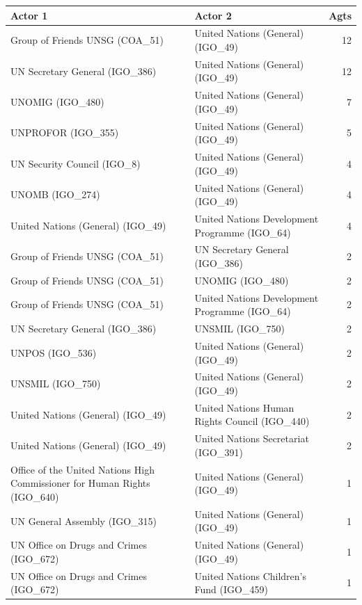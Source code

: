 \documentclass{article}
\begin{document}
\begin{table}[H]
\begin{center}
\small
\begin{tabularx}{\textwidth}{|X|X|r|}
    \hline
    \textbf{Actor 1} & \textbf{Actor 2} & \textbf{Agts} \\
    \hline
    \hline
Group of Friends UNSG (COA\_51) & United Nations (General) (IGO\_49) & 12 \\
\hline
UN Secretary General (IGO\_386) & United Nations (General) (IGO\_49) & 12 \\
\hline
UNOMIG (IGO\_480) & United Nations (General) (IGO\_49) & 7 \\
\hline
UNPROFOR (IGO\_355) & United Nations (General) (IGO\_49) & 5 \\
\hline
UN Security Council (IGO\_8) & United Nations (General) (IGO\_49) & 4 \\
\hline
UNOMB (IGO\_274) & United Nations (General) (IGO\_49) & 4 \\
\hline
United Nations (General) (IGO\_49) & United Nations Development Programme (IGO\_64) & 4 \\
\hline
Group of Friends UNSG (COA\_51) & UN Secretary General (IGO\_386) & 2 \\
\hline
Group of Friends UNSG (COA\_51) & UNOMIG (IGO\_480) & 2 \\
\hline
Group of Friends UNSG (COA\_51) & United Nations Development Programme (IGO\_64) & 2 \\
\hline
UN Secretary General (IGO\_386) & UNSMIL (IGO\_750) & 2 \\
\hline
UNPOS (IGO\_536) & United Nations (General) (IGO\_49) & 2 \\
\hline
UNSMIL (IGO\_750) & United Nations (General) (IGO\_49) & 2 \\
\hline
United Nations (General) (IGO\_49) & United Nations Human Rights Council (IGO\_440) & 2 \\
\hline
United Nations (General) (IGO\_49) & United Nations Secretariat (IGO\_391) & 2 \\
\hline
Office of the United Nations High Commissioner for Human Rights (IGO\_640) & United Nations (General) (IGO\_49) & 1 \\
\hline
UN General Assembly (IGO\_315) & United Nations (General) (IGO\_49) & 1 \\
\hline
UN Office on Drugs and Crimes (IGO\_672) & United Nations (General) (IGO\_49) & 1 \\
\hline
UN Office on Drugs and Crimes (IGO\_672) & United Nations Children's Fund (IGO\_459) & 1 \\

\end{tabularx}
\end{center}
\end{table}
\end{document}
